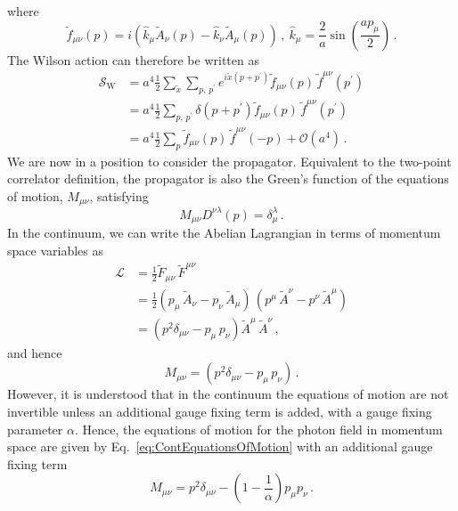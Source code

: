 %
where
%
\begin{equation}
\tilde{f}_{\mu\nu}(p) = i\left(\hat{k}_\mu \tilde{A}_\nu(p) - \hat{k}_\nu \tilde{A}_\mu(p)\right)\, ,~\hat{k}_\mu = \frac{2}{a}\sin\left(\frac{ap_\mu}{2}\right)\, .
\end{equation}
%
The Wilson action can therefore be written as
%
\begin{align}
\mathcal{S}_\text{W} &= a^4\frac{1}{2}\sum_{\tilde{x}}\sum_{p,\,p^\prime}e^{i\tilde{x}(p+p^\prime)}\tilde{f}_{\mu\nu}(p) \, \tilde{f}^{\mu\nu}(p^\prime)\nonumber\\
&=a^4\frac{1}{2}\sum_{p,\,p^\prime} \delta(p+p^\prime)\tilde{f}_{\mu\nu}(p) \, \tilde{f}^{\mu\nu}(p^\prime) \nonumber\\
&= a^4\frac{1}{2}\sum_{p}\tilde{f}_{\mu\nu}(p) \, \tilde{f}^{\mu\nu}(-p) + \mathcal{O}(a^4)\, . \label{eq:WilsonMomentum}
\end{align}
%
We are now in a position to consider the propagator. Equivalent to the two-point correlator definition, the propagator is also the Green's function of the equations of motion, $M_{\mu\nu}$, satisfying
%
\begin{equation}
M_{\mu\nu}D^{\nu\lambda}(p) = \delta_\mu^\lambda\, .
\end{equation}
%
In the continuum, we can write the Abelian Lagrangian in terms of momentum space variables as 
%
\begin{align*}
\mathcal{L} &= \frac{1}{2}\tilde{F}_{\mu\nu}\,\tilde{F}^{\mu\nu}\\
&= \frac{1}{2}(p_\mu\,\tilde{A}_\nu - p_\nu\,\tilde{A}_\mu)\,(p^\mu\,\tilde{A}^\nu - p^\nu\,\tilde{A}^\mu)\\
&= (p^2\delta_{\mu\nu} - p_\mu\,p_\nu)\tilde{A}^\mu\,\tilde{A}^\nu\, ,
\end{align*}
%
and hence
%
\begin{equation}
M_{\mu\nu} = (p^2\delta_{\mu\nu} - p_\mu\,p_\nu)\, .
\label{eq:ContEquationsOfMotion}
\end{equation}
%
However, it is understood that in the continuum the equations of motion are not invertible unless an additional gauge fixing term is added, with a gauge fixing parameter $\alpha$. Hence, the equations of motion for the photon field in momentum space are given by Eq.~\eqref{eq:ContEquationsOfMotion} with an additional gauge fixing term~\cite{ryder1996quantum}
%
\begin{equation}
M_{\mu\nu} = p^2\delta_{\mu\nu} - \left(1-\frac{1}{\alpha}\right)p_\mu p_\nu\, .
\end{equation}
